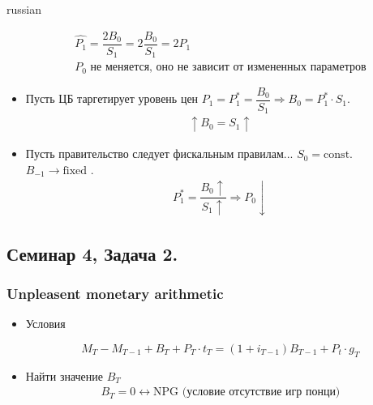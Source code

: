 \documentclass{article}
\begin{document}
\begin{otherlanguage*}{russian}
\begin{itemize}
\begin{align*}
\hat{P_1} = \dfrac{2 B_0}{S_1}  = 2 \dfrac{B_0}{S_1} = 2 P_1 \\
P_0 \text{ не меняется, оно не зависит от измененных параметров} 
\end{align*}
\item  Пусть ЦБ таргетирует уровень цен $ P_1 = P^*_1 = \dfrac{B_0}{S_1} \Rightarrow B_0 = P^*_1 \cdot  S_1 $. 
\begin{align*}
\uparrow B_0 = S_1 \uparrow 
\end{align*}
\item Пусть правительство следует фискальным правилам... $ S_0 = \text{const} $. $ B_{-1} \rightarrow \text{fixed } $.
\begin{align*}
P_1^* = \dfrac{B_0 \uparrow}{S_1 \uparrow} \Rightarrow P_0 \downarrow
\end{align*}
\end{itemize}
\subsection*{Семинар 4, Задача 2.}
\subsubsection*{Unpleasent monetary arithmetic }
\begin{itemize}
\item Условия 

$$ M_T - M_{T-1} + B_T + P_T \cdot t_T = ( 1 + i_{T-1} ) B_{T - 1} + P_t \cdot g_T $$

\item Найти значение $ B_T $ 
\begin{align*}
B_T = 0  \leftrightarrow \text{NPG (условие отсутствие игр понци)}
\end{align*}


\end{itemize}
\end{otherlanguage*}
\end{document}
